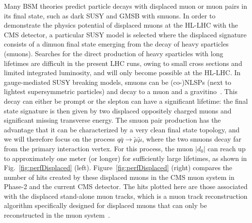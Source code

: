 Many BSM theories predict particle decays with displaced muon or muon pairs in its final state, such as dark SUSY and GMSB with smuons.
In order to demonstrate the physics potential of displaced muons at the HL-LHC with the CMS detector,
a particular SUSY model is selected where the displaced signature consists of a dimuon final state emerging from the decay of heavy sparticles (smuons).
Searches for the direct production of heavy sparticles with long lifetimes are difficult in the present LHC runs,
owing to small cross sections and limited integrated luminosity, and will only become possible at the HL-LHC.
In gauge-mediated SUSY breaking models, smuons can be (co-)NLSPs (next to lightest supersymmetric particles) and decay to a muon and a gravitino~\cite{Ruderman:2010kj}.
This decay can either be prompt or the slepton can have a significant lifetime: the final state signature is then given
by two displaced oppositely charged muons and significant missing transverse energy.
The smuon pair production has the advantage that it can be characterized by a very clean final state topology, and
we will therefore focus on the process $q \bar q \to \widetilde{\mu} \widetilde{\mu}$, where the two smuons decay far from the primary interaction vertex.
For this process, the muon $|d_0|$ can reach up to approximately one meter (or longer) for sufficiently large lifetimes,
as shown in Fig.~\ref{fig:perfDisplaced} (left). Figure~\ref{fig:perfDisplaced} (right)
compares the number of hits created by these displaced muons in the CMS muon system in Phase-2 and the current CMS detector.
The hits plotted here are those associated with the displaced stand-alone muon tracks, which is a muon track reconstruction
algorithm specifically designed for displaced muons that can only be reconstructed in the muon system~\cite{CMS-DP-2015-015}.


